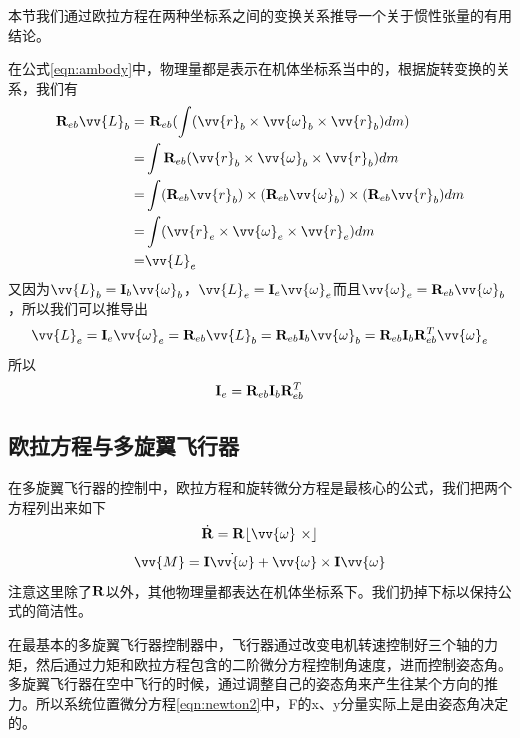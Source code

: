 \documentclass[11pt]{article}
\begin{document}
本节我们通过欧拉方程在两种坐标系之间的变换关系推导一个关于惯性张量的有用结论。

在公式\ref{eqn:ambody}中，物理量都是表示在机体坐标系当中的，根据旋转变换的关系，我们有
\begin{align*}
{\bf R}_{eb}\vv{L}_b = & \ {\bf R}_{eb} (\int (\vv{r}_b \times \vv{\omega}_b\times\vv{r}_b) dm)\\
= & \int {\bf R}_{eb}(\vv{r}_b \times \vv{\omega}_b\times\vv{r}_b) dm \\
= & \int ({\bf R}_{eb}\vv{r}_b) \times ({\bf R}_{eb}\vv{\omega}_b) \times ({\bf R}_{eb}\vv{r}_b) dm \\
= & \int (\vv{r}_e \times \vv{\omega}_e\times\vv{r}_e) dm \\
= & \vv{L}_e
\end{align*}
又因为$\vv{L}_b = {\bf I}_b\vv{\omega}_b$，$\vv{L}_e = {\bf I}_e\vv{\omega}_e$而且$\vv{{\omega}}_e = {\bf R}_{eb}\vv{\omega}_b$，所以我们可以推导出
$$
\vv{L}_e = {\bf I}_e\vv{\omega}_e = {\bf R}_{eb}\vv{L}_b = {\bf R}_{eb}{\bf I}_b\vv{\omega}_b = {\bf R}_{eb}{\bf I}_b{\bf R}^T_{eb}\vv{\omega}_e 
$$ 
所以
\begin{equation}\label{eqn:tensortrans}
{\bf I}_e = {\bf R}_{eb}{\bf I}_b{\bf R}^T_{eb}
\end{equation}



\subsection{欧拉方程与多旋翼飞行器}
在多旋翼飞行器的控制中，欧拉方程和旋转微分方程是最核心的公式，我们把两个方程列出来如下
$$
\dot{{\bf R}} = {\bf R}\lfloor \vv{\omega} \ \times \rfloor
$$
$$
\vv{M} = {\bf I}\dot{\vv{\omega}} + \vv{\omega} \times {\bf I}\vv{\omega}
$$
注意这里除了${\bf R}$以外，其他物理量都表达在机体坐标系下。我们扔掉下标以保持公式的简洁性。

在最基本的多旋翼飞行器控制器中，飞行器通过改变电机转速控制好三个轴的力矩，然后通过力矩和欧拉方程包含的二阶微分方程控制角速度，进而控制姿态角。多旋翼飞行器在空中飞行的时候，通过调整自己的姿态角来产生往某个方向的推力。所以系统位置微分方程\ref{eqn:newton2}中，F的x、y分量实际上是由姿态角决定的。
\end{document}
